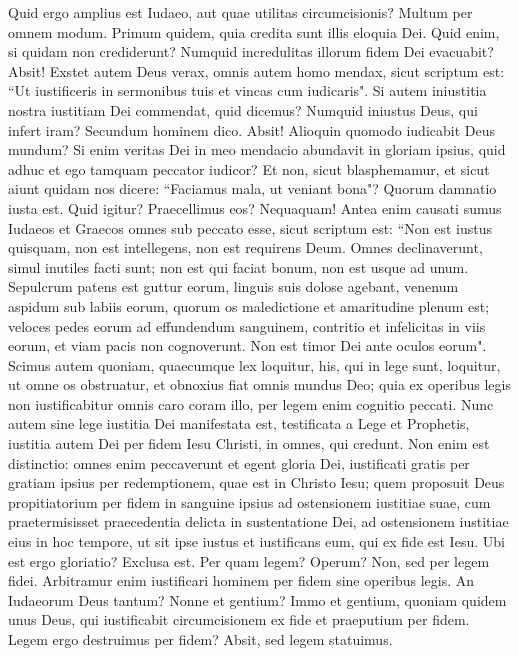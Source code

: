 \begin{biblechapter}  
\verse Quid ergo amplius est Iudaeo, aut quae utilitas circumcisionis? 
\verse Multum per omnem modum. Primum quidem, quia credita sunt illis eloquia Dei. 
\verse Quid enim, si quidam non crediderunt? Numquid incredulitas illorum fidem Dei evacuabit? 
\verse Absit! Exstet autem Deus verax, omnis autem homo mendax, sicut scriptum est: “Ut iustificeris in sermonibus tuis et vincas cum iudicaris". 
\verse Si autem iniustitia nostra iustitiam Dei commendat, quid dicemus? Numquid iniustus Deus, qui infert iram? Secundum hominem dico. 
\verse Absit! Alioquin quomodo iudicabit Deus mundum? 
\verse Si enim veritas Dei in meo mendacio abundavit in gloriam ipsius, quid adhuc et ego tamquam peccator iudicor? 
\verse Et non, sicut blasphemamur, et sicut aiunt quidam nos dicere: “Faciamus mala, ut veniant bona"? Quorum damnatio iusta est. 
\verse Quid igitur? Praecellimus eos? Nequaquam! Antea enim causati sumus Iudaeos et Graecos omnes sub peccato esse, 
\verse sicut scriptum est: “Non est iustus quisquam, 
\verse non est intellegens, non est requirens Deum. 
\verse Omnes declinaverunt, simul inutiles facti sunt; non est qui faciat bonum, non est usque ad unum. 
\verse Sepulcrum patens est guttur eorum, linguis suis dolose agebant, venenum aspidum sub labiis eorum, 
\verse quorum os maledictione et amaritudine plenum est; 
\verse veloces pedes eorum ad effundendum sanguinem, 
\verse contritio et infelicitas in viis eorum, 
\verse et viam pacis non cognoverunt. 
\verse Non est timor Dei ante oculos eorum". 
\verse Scimus autem quoniam, quaecumque lex loquitur, his, qui in lege sunt, loquitur, ut omne os obstruatur, et obnoxius fiat omnis mundus Deo; 
\verse quia ex operibus legis non iustificabitur omnis caro coram illo, per legem enim cognitio peccati. 
\verse Nunc autem sine lege iustitia Dei manifestata est, testificata a Lege et Prophetis, 
\verse iustitia autem Dei per fidem Iesu Christi, in omnes, qui credunt. Non enim est distinctio: 
\verse omnes enim peccaverunt et egent gloria Dei, 
\verse iustificati gratis per gratiam ipsius per redemptionem, quae est in Christo Iesu; 
\verse quem proposuit Deus propitiatorium per fidem in sanguine ipsius ad ostensionem iustitiae suae, cum praetermisisset praecedentia delicta  
\verse in sustentatione Dei, ad ostensionem iustitiae eius in hoc tempore, ut sit ipse iustus et iustificans eum, qui ex fide est Iesu. 
\verse Ubi est ergo gloriatio? Exclusa est. Per quam legem? Operum? Non, sed per legem fidei. 
\verse Arbitramur enim iustificari hominem per fidem sine operibus legis. 
\verse An Iudaeorum Deus tantum? Nonne et gentium? Immo et gentium,  
\verse quoniam quidem unus Deus, qui iustificabit circumcisionem ex fide et praeputium per fidem. 
\verse Legem ergo destruimus per fidem? Absit, sed legem statuimus. 
\end{biblechapter}

